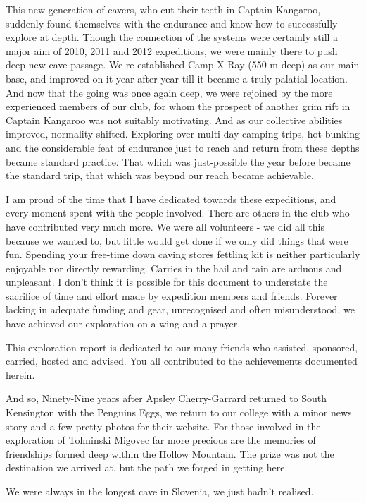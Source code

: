 This new generation of cavers, who cut their teeth in Captain Kangaroo,
suddenly found themselves with the endurance and know-how to
successfully explore at depth. Though the connection of the systems were
certainly still a major aim of 2010, 2011 and 2012 expeditions, we were
mainly there to push deep new cave passage. We re-established Camp X-Ray
(550 m deep) as our main base, and improved on it year after year till
it became a truly palatial location. And now that the going was once
again deep, we were rejoined by the more experienced members of our
club, for whom the prospect of another grim rift in Captain Kangaroo was
not suitably motivating. And as our collective abilities improved,
normality shifted. Exploring over multi-day camping trips, hot bunking
and the considerable feat of endurance just to reach and return from
these depths became standard practice. That which was just-possible the
year before became the standard trip, that which was beyond our reach
became achievable.

I am proud of the time that I have dedicated towards these expeditions,
and every moment spent with the people involved. There are others in the
club who have contributed very much more. We were all volunteers - we
did all this because we wanted to, but little would get done if we only
did things that were fun. Spending your free-time down caving stores
fettling kit is neither particularly enjoyable nor directly rewarding.
Carries in the hail and rain are arduous and unpleasant. I don't think
it is possible for this document to understate the sacrifice of time and
effort made by expedition members and friends. Forever lacking in
adequate funding and gear, unrecognised and often misunderstood, we have
achieved our exploration on a wing and a prayer.

This exploration report is dedicated to our many friends who assisted,
sponsored, carried, hosted and advised. You all contributed to the
achievements documented herein.

And so, Ninety-Nine years after Apsley Cherry-Garrard returned to South
Kensington with the Penguins Eggs, we return to our college with a minor
news story and a few pretty photos for their website. For those involved
in the exploration of Tolminski Migovec far more precious are the
memories of friendships formed deep within the Hollow Mountain. The
prize was not the destination we arrived at, but the path we forged in
getting here.

We were always in the longest cave in Slovenia, we just hadn't realised.

